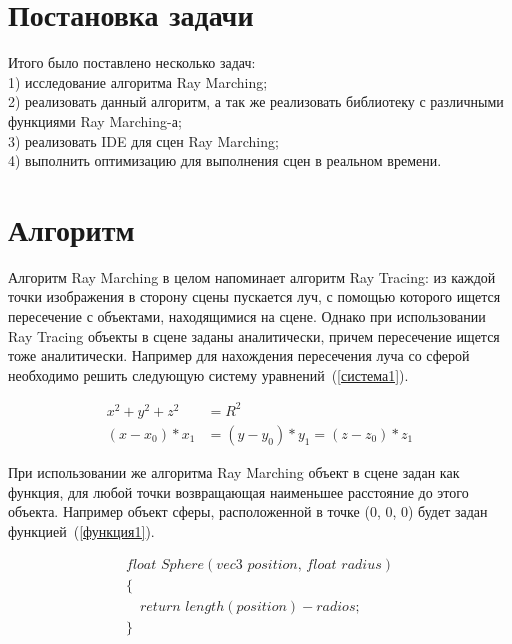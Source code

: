 \documentclass[14pt]{matmex-diploma}
\begin{document}
\section{Постановка задачи}
Итого было поставлено несколько задач: \\
1) исследование алгоритма Ray Marching; \\
2) реализовать данный алгоритм, а так же реализовать библиотеку с различными функциями Ray Marching-а; \\
3) реализовать IDE для сцен Ray Marching; \\
4) выполнить оптимизацию для выполнения сцен в реальном времени. \\

\section{Алгоритм}
Алгоритм Ray Marching в целом напоминает алгоритм Ray Tracing: из каждой точки изображения в сторону сцены пускается луч,
с помощью которого ищется пересечение с объектами, находящимися на сцене. Однако при использовании
Ray Tracing объекты в сцене заданы аналитически, причем пересечение ищется тоже аналитически. Например для
нахождения пересечения луча со сферой необходимо решить следующую систему уравнений~(\ref{система1}). 

\begin{equation}
\label{система1}
\begin{array}{rl}
x^2 + y^2 + z^2 & = R^2\\
(x - x_{0}) * x_{1} & = (y - y_{0}) * y_{1} = (z - z_{0}) * z_{1}
\end{array}
\end{equation}

При использовании же алгоритма Ray Marching объект в сцене задан как функция, для любой точки возвращающая 
наименьшее расстояние до этого объекта. Например объект
сферы, расположенной в точке (0, 0, 0) будет задан функцией~(\ref{функция1}). 

\begin{equation}
\label{функция1}
\begin{array}{ll}
float\,\,Sphere(vec3\,\,position,\, float\,\,radius)\\
\{                                                  \\
\,\,\,\,\,\, return\,\,length(position) - radios;   \\
\}                                                  \\
\end{array}
\end{equation}
\end{document}
